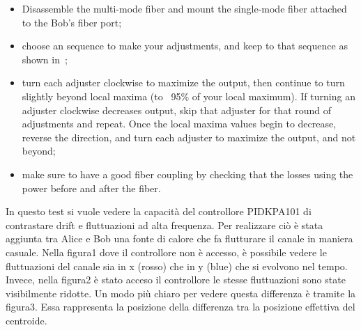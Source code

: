 \begin{itemize}
  \item Disassemble the multi-mode fiber and mount the single-mode fiber attached to the Bob's fiber port;
  \item choose an sequence to make your adjustments, and keep to that sequence as shown in~;
  \item turn each adjuster clockwise to maximize the output, then continue to turn slightly beyond local maxima (to ~95\% of your local maximum). If turning an adjuster clockwise decreases output, skip that adjuster for that round of adjustments and repeat. Once the local maxima values begin to decrease, reverse the direction, and turn each adjuster to maximize the output, and not beyond;
  \item make sure to have a good fiber coupling by checking that the losses using the power before and after the fiber.
\end{itemize}



In questo test si vuole vedere la capacità del controllore PIDKPA101 di contrastare drift e fluttuazioni ad alta frequenza.
Per realizzare ciò è stata aggiunta tra Alice e Bob una fonte di calore che fa flutturare il canale in maniera casuale.
Nella figura1 dove il controllore non è accesso, è possibile vedere le fluttuazioni del canale sia in x (rosso) che in y (blue) che si evolvono nel tempo.
Invece, nella figura2 è stato acceso il controllore le stesse fluttuazioni sono state visibilmente ridotte.
Un modo più chiaro per vedere questa differenza è tramite la figura3. Essa rappresenta la posizione della differenza tra la posizione effettiva del centroide.




